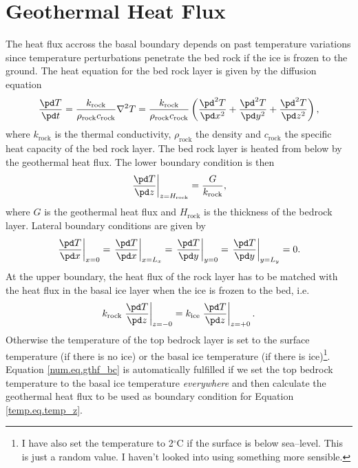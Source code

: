 \section{Geothermal Heat Flux}
The heat flux accross the basal boundary depends on past temperature variations since temperature perturbations penetrate the bed rock if the ice is frozen to the ground. The heat equation for the bed rock layer is given by the diffusion equation
\begin{equation}
  \label{num.eq.diffu_rock}
  \frac{\pd T}{\pd t} = \frac{k_{\text{rock}}}{\rho_{\text{rock}}c_{\text{rock}}}\nabla^2T=\frac{k_{\text{rock}}}{\rho_{\text{rock}}c_{\text{rock}}} 
  \left(\frac{\pd^2 T}{\pd x^2}+\frac{\pd^2 T}{\pd y^2}+\frac{\pd^2 T}{\pd z^2}\right),
\end{equation}
where $k_{\text{rock}}$ is the thermal conductivity, $\rho_{\text{rock}}$ the density and $c_{\text{rock}}$ the specific heat capacity of the bed rock layer. The bed rock layer is heated from below by the geothermal heat flux. The lower boundary condition is then
\begin{equation}
  \left.\frac{\pd T}{\pd z}\right|_{z=H_{\text{rock}}}=\frac{G}{k_{\text{rock}}},
\end{equation}
where $G$ is the geothermal heat flux and $H_{\text{rock}}$ is the thickness of the bedrock layer. Lateral boundary conditions are given by
\begin{equation}
  \left.\frac{\pd T}{\pd x}\right|_{x=0} = \left.\frac{\pd T}{\pd x}\right|_{x=L_x} = \left.\frac{\pd T}{\pd y}\right|_{y=0} = \left.\frac{\pd T}{\pd y}\right|_{y=L_y} = 0.
\end{equation}
At the upper boundary, the heat flux of the rock layer has to be matched with the heat flux in the basal ice layer when the ice is frozen to the bed, i.e.
\begin{equation}
  \label{num.eq.gthf_bc}
  k_{\text{rock}}\left.\frac{\pd T}{\pd z}\right|_{z=-0}=k_{\text{ice}}\left.\frac{\pd T}{\pd z}\right|_{z=+0}.
\end{equation}
Otherwise the temperature of the top bedrock layer is set to the surface temperature (if there is no ice) or the basal ice temperature (if there is ice)\footnote{I have also set the temperature to 2$^\circ$C if the surface is below sea--level. This is just a random value. I haven't looked into using something more sensible.}. Equation \eqref{num.eq.gthf_bc} is automatically fulfilled if we set the top bedrock temperature to the basal ice temperature \emph{everywhere} and then calculate the geothermal heat flux to be used as boundary condition for Equation \eqref{temp.eq.temp_z}.

